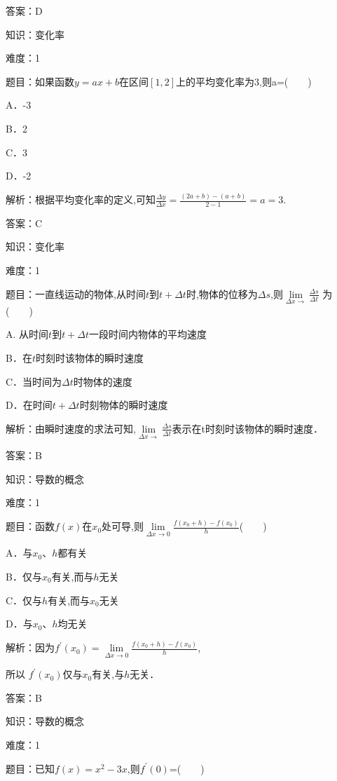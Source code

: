 \documentclass{article} %
\begin{document}
答案：D



知识：变化率

难度：1

题目：如果函数$y=ax+b$在区间$[1,2]$上的平均变化率为3,则a=(　　)



A．-3  

B．2  

C．3  

D．-2

解析：根据平均变化率的定义,可知$\frac{\Delta y}{\Delta x}=\frac{(2a+b)-(a+b)}{2-1}=a=3$.

答案：C



知识：变化率

难度：1

题目：一直线运动的物体,从时间$t$到$t+\Delta t$时,物体的位移为$\Delta s$,则$\lim\limits_{\Delta x \rightarrow}\frac{\Delta s}{\Delta t}$ 为(　　)

A. 从时间$t$到$t+\Delta t$一段时间内物体的平均速度

B．在$t$时刻时该物体的瞬时速度

C．当时间为$\Delta t$时物体的速度

D．在时间$t+\Delta t$时刻物体的瞬时速度

解析：由瞬时速度的求法可知,$\lim\limits_{\Delta x \rightarrow}\frac{\Delta s}{\Delta t}$表示在t时刻时该物体的瞬时速度．

答案：B



知识：导数的概念

难度：1

题目：函数$f(x)$在$x_{0}$处可导,则$\lim\limits_{\Delta x \rightarrow 0}\frac{f(x_0+h)-f(x_0)}{h}$(　　)

A．与$x_{0}$、$h$都有关

B．仅与$x_{0}$有关,而与$h$无关

C．仅与$h$有关,而与$x_{0}$无关

D．与$x_{0}$、$h$均无关

解析：因为$f^{'}(x_{0})= \lim\limits_{\Delta x \rightarrow 0}\frac{f(x_0+h)-f(x_0)}{h}$,

所以 $f^{'}(x_{0})$仅与$x_{0}$有关,与$h$无关．

答案：B



知识：导数的概念

难度：1

题目：已知$f(x)=x^{2}-3x$,则$f^{'}(0)$=(　　)
\end{document}
